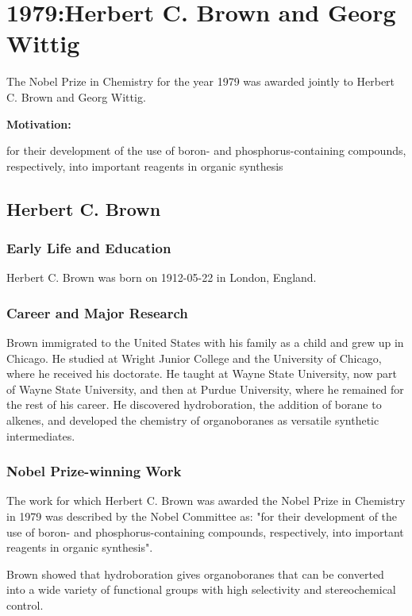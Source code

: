 \chapter{1979:Herbert C. Brown and Georg Wittig}

\label{chap:chemistry1979}

The Nobel Prize in Chemistry for the year 1979 was awarded jointly to Herbert C. Brown and Georg Wittig.

\textbf{Motivation:}

for their development of the use of boron- and phosphorus-containing compounds, respectively, into important reagents in organic synthesis

\section{Herbert C. Brown}

\subsection*{Early Life and Education}

Herbert C. Brown was born on 1912-05-22 in London, England.

\subsection*{Career and Major Research}

Brown immigrated to the United States with his family as a child and grew up in Chicago. He studied at Wright Junior College and the University of Chicago, where he received his doctorate. He taught at Wayne State University, now part of Wayne State University, and then at Purdue University, where he remained for the rest of his career. He discovered hydroboration, the addition of borane to alkenes, and developed the chemistry of organoboranes as versatile synthetic intermediates.

\subsection*{Nobel Prize-winning Work}

The work for which Herbert C. Brown was awarded the Nobel Prize in Chemistry in 1979 was described by the Nobel Committee as: "for their development of the use of boron- and phosphorus-containing compounds, respectively, into important reagents in organic synthesis".

Brown showed that hydroboration gives organoboranes that can be converted into a wide variety of functional groups with high selectivity and stereochemical control.


